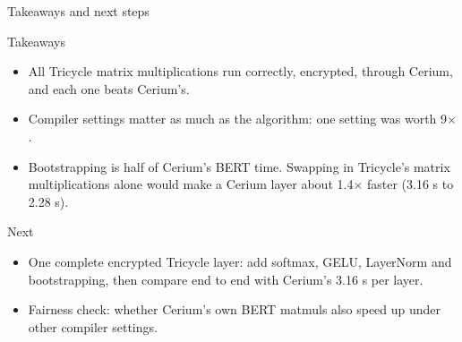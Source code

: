\documentclass[aspectratio=169]{beamer}
\begin{document}
\begin{frame}{Takeaways and next steps}
\small
\begin{block}{Takeaways}
\begin{itemize}\small
  \item All Tricycle matrix multiplications run correctly, encrypted, through Cerium, and each one beats Cerium's.
  \item Compiler settings matter as much as the algorithm: one setting was worth 9$\times$.
  \item Bootstrapping is half of Cerium's BERT time. Swapping in Tricycle's matrix multiplications alone would make a Cerium layer about 1.4$\times$ faster (3.16 s to 2.28 s).
\end{itemize}
\end{block}
\begin{block}{Next}
\begin{itemize}\small
  \item One complete encrypted Tricycle layer: add softmax, GELU, LayerNorm and bootstrapping, then compare end to end with Cerium's 3.16 s per layer.
  \item Fairness check: whether Cerium's own BERT matmuls also speed up under other compiler settings.
\end{itemize}
\end{block}
\end{frame}
\end{document}
